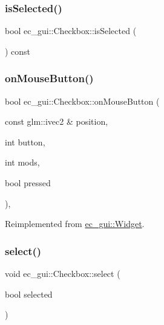 \subsubsection{\texorpdfstring{is\+Selected()}{isSelected()}}
{\footnotesize\ttfamily bool ec\+\_\+gui\+::\+Checkbox\+::is\+Selected (\begin{DoxyParamCaption}{ }\end{DoxyParamCaption}) const}

\mbox{\label{classec__gui_1_1_checkbox_a2c9a4610ead12fd4cb8cb7e4fe38f169}} 
\subsubsection{\texorpdfstring{on\+Mouse\+Button()}{onMouseButton()}}
{\footnotesize\ttfamily bool ec\+\_\+gui\+::\+Checkbox\+::on\+Mouse\+Button (\begin{DoxyParamCaption}\item[{const glm\+::ivec2 \&}]{position,  }\item[{int}]{button,  }\item[{int}]{mods,  }\item[{bool}]{pressed }\end{DoxyParamCaption})\hspace{0.3cm}{\ttfamily [override]}, {\ttfamily [virtual]}}



Reimplemented from \mbox{\hyperlink{classec__gui_1_1_widget_a824efc45fa4df40d7e1e94f08e6363cf}{ec\+\_\+gui\+::\+Widget}}.

\mbox{\label{classec__gui_1_1_checkbox_a3aee4963557c5f5cd626ec1050082c5c}} 
\subsubsection{\texorpdfstring{select()}{select()}}
{\footnotesize\ttfamily void ec\+\_\+gui\+::\+Checkbox\+::select (\begin{DoxyParamCaption}\item[{bool}]{selected }\end{DoxyParamCaption})\hspace{0.3cm}{\ttfamily [virtual]}}

